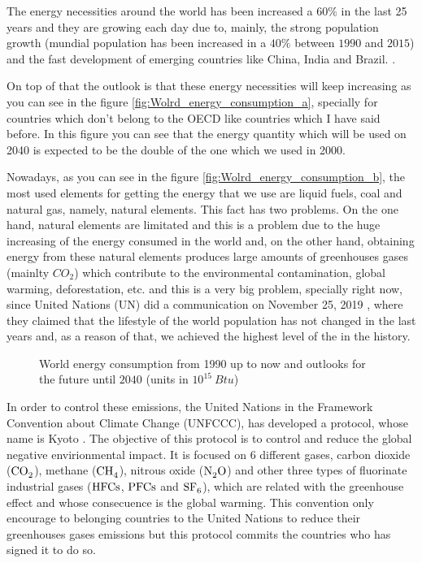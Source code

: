 The energy necessities around the world has been increased a $60\%$ in the last 25 years and they are growing each day due to, mainly, the strong population growth (mundial population has been increased in a $40\%$ between $1990$ and $2015$) and the fast development of emerging countries like China, India and Brazil. \cite{Renovables}. 

On top of that the outlook is that these energy necessities will keep increasing as you can see in the figure \ref{fig:Wolrd_energy_consumption_a}, specially for countries which don't belong to the OECD like countries which I have said before. In this figure you can see that the energy quantity which will be used on 2040 is expected to be the double of the one which we used in 2000. 

Nowadays, as you can see in the figure \ref{fig:Wolrd_energy_consumption_b}, the most used elements for getting the energy that we use are liquid fuels, coal and natural gas, namely, natural elements. This fact has two problems. On the one hand, natural elements are limitated and this is a problem due to the huge increasing of the energy consumed in the world and, on the other hand, obtaining energy from these natural elements produces large amounts of greenhouses gases (mainlty $CO_2$) which contribute to the environmental contamination, global warming, deforestation, etc. and this is a very big problem, specially right now, since United Nations (UN) did a communication on November 25, 2019 \cite{HighestCO2}, where they claimed that the lifestyle of the world population has not changed in the last years and, as a reason of that, we achieved the highest level of the  in the history.

\begin{figure}[htbp]
 \centering
 \caption{World energy consumption from 1990 up to now and outlooks for the future until $2040$ (units in $10^{15}~Btu$) \cite{EIA}}
 \label{fig:Wolrd_energy_consumption} 
\end{figure}

In order to control these emissions, the United Nations in the Framework Convention about Climate Change (UNFCCC), has developed a protocol, whose name is Kyoto \cite{Kyoto}. The objective of this protocol is to control and reduce the global negative envirionmental impact. It is focused on 6 different gases, carbon dioxide ($\ce{CO_2}$), methane ($\ce{CH_4}$), nitrous oxide ($\ce{N_2 O}$) and other three types of fluorinate industrial gases ($\ce{HFCs}$, $\ce{PFCs}$ and $\ce{SF6}$), which are related with the greenhouse effect and whose consecuence is the global warming. This convention only encourage to belonging countries to the United Nations to reduce their greenhouses gases emissions but this protocol commits the countries who has signed it to do so.

